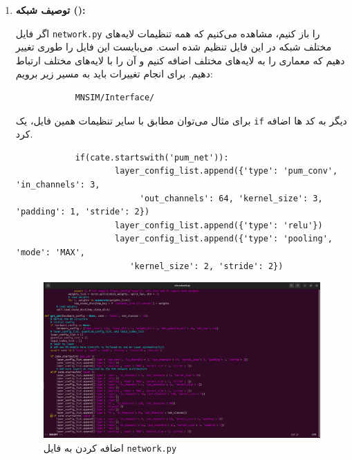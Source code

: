 \documentclass[12pt]{exam}
\begin{document}
\begin{questions}
\begin{enumerate}
	
	
	

	
	
	\item \textbf{توصیف شبکه ():}
	
	اگر فایل \texttt{network.py} را باز کنیم، مشاهده می‌کنیم که همه تنظیمات لایه‌های مختلف شبکه در این فایل تنظیم شده است. می‌بایست این فایل را طوری تغییر دهیم که معماری  را به لایه‌های مختلف اضافه کنیم و آن را با لایه‌های مختلف ارتباط دهیم. برای انجام تغییرات باید به مسیر زیر برویم:
	\begin{latin}
		\begin{verbatim}
			MNSIM/Interface/
		\end{verbatim} 
	\end{latin}
	
	برای مثال می‌توان مطابق با سایر تنظیمات همین فایل، یک \texttt{if} دیگر به کد ها اضافه کرد.
	
	\begin{latin}
		\begin{verbatim}
			if(cate.startswith('pum_net')):
				    layer_config_list.append({'type': 'pum_conv', 'in_channels': 3,
					     'out_channels': 64, 'kernel_size': 3, 'padding': 1, 'stride': 2})
				    layer_config_list.append({'type': 'relu'})
				    layer_config_list.append({'type': 'pooling', 'mode': 'MAX',
				       'kernel_size': 2, 'stride': 2})
		\end{verbatim} 
	\end{latin}
	
	\begin{figure}[h]
		\centering
		\includegraphics[width=1\textwidth]{images/7-Add_PUM_to_network.png}
		\caption{اضافه کردن  به فایل \texttt{network.py}}
		\label{اضافه کردن PUM به فایل network}
	\end{figure}
	

\end{enumerate}
\end{questions}
\end{document}
